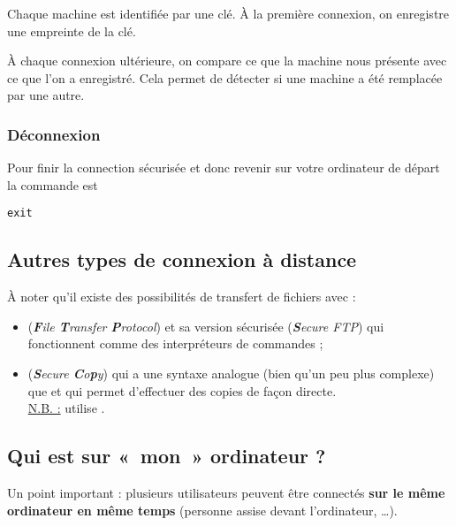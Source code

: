 \documentclass[11pt,a4paper]{article}
\begin{document}
Chaque machine est identifiée par une clé.
À la première connexion, on enregistre une empreinte de la clé. 

À chaque connexion ultérieure, on compare ce que la machine nous présente avec
ce que l'on a enregistré. Cela permet de détecter si une machine a été
remplacée par une autre.


\subsubsection{Déconnexion}

Pour finir la connection sécurisée et donc revenir sur votre ordinateur de
départ la commande est

\begin{verbatim}
exit
\end{verbatim}

\subsection{Autres types de connexion à distance}

À noter qu'il existe des possibilités de transfert de
fichiers avec :
\begin{itemize}
 \item {} ({\em {\bf F}ile {\bf T}ransfer {\bf P}rotocol})
       et sa version sécurisée  ({\em {\bf S}ecure
       FTP}) qui fonctionnent comme des interpréteurs de
       commandes ;
 \item {} ({\em {\bf S}ecure {\bf C}o{\bf p}y}) qui
       a une syntaxe analogue (bien qu'un peu plus complexe) que
        et qui permet d'effectuer des copies de façon
       directe.\\ \underline{N.B. :}  utilise .
\end{itemize}


\subsection{Qui est sur «~mon~» ordinateur ?}

Un point important : plusieurs utilisateurs peuvent être
connectés {\bf sur le même ordinateur en même temps} (personne
assise devant l'ordinateur, \ldots).
\end{document}
